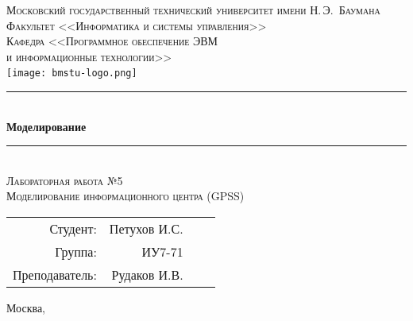 \newcommand{\HRule}{\rule{\linewidth}{0.5mm}}

\begin{center}

\textsc{\large Московский государственный технический университет имени Н.\,Э.~Баумана}\\[0.5cm]
\textsc{Факультет <<Информатика и системы управления>>}\\
\textsc{Кафедра <<Программное обеспечение ЭВМ\\и информационные технологии>>}\\[0.25cm]

\texttt{[image: bmstu-logo.png]}~\\[2.25cm]



\HRule \\[0.5cm]
{\huge \bfseries Моделирование}
\HRule \\[0.5cm]

\textsc{\large Лабораторная работа №5}\\
\textsc{Моделирование информационного центра (GPSS)}

\vfill

\begin{flushright}
  \begin{tabular}{rrlc}
    Студент: & Петухов И.С.\\
    Группа: & ИУ7-71\\
    Преподаватель: & Рудаков И.В.\\
  \end{tabular}
\end{flushright}

{\large Москва, \the\year}

\end{center}

\newpage
{}